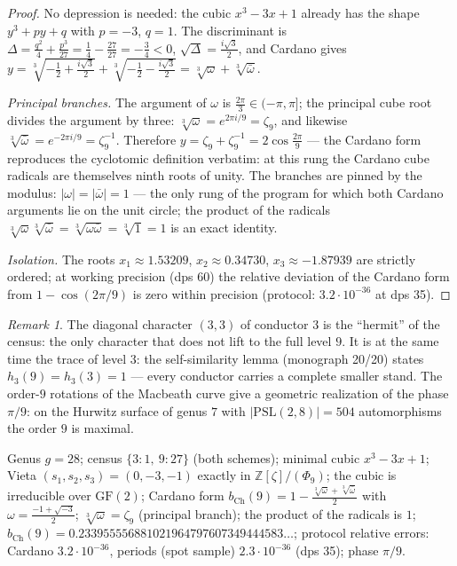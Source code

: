 \documentclass[11pt,a4paper]{article}
\theoremstyle{plain}
\theoremstyle{definition}
\theoremstyle{remark}
\newtheorem{remark}[theorem]{Remark}
\newcommand{\ZZ}{\mathbb{Z}}
\begin{document}
\begin{proof}
No depression is needed: the cubic $x^3-3x+1$ already has the
shape $y^3+py+q$ with $p=-3$, $q=1$. The discriminant is
$\Delta=\frac{q^2}{4}+\frac{p^3}{27}=\frac14-\frac{27}{27}
=-\frac34<0$, $\sqrt\Delta=\frac{i\sqrt3}{2}$, and Cardano gives
$y=\sqrt[3]{-\frac12+\frac{i\sqrt3}{2}}+\sqrt[3]{-\frac12-\frac{i\sqrt3}{2}}
=\sqrt[3]{\omega}+\sqrt[3]{\bar\omega}$.

\emph{Principal branches.} The argument of $\omega$ is
$\frac{2\pi}{3}\in(-\pi,\pi]$; the principal cube root divides
the argument by three: $\sqrt[3]{\omega}=e^{2\pi i/9}=\zeta_9$,
and likewise $\sqrt[3]{\bar\omega}=e^{-2\pi i/9}=\zeta_9^{-1}$.
Therefore $y=\zeta_9+\zeta_9^{-1}=2\cos\frac{2\pi}{9}$ --- the
Cardano form reproduces the cyclotomic definition verbatim: at
this rung the Cardano cube radicals are themselves ninth roots of
unity. The branches are pinned by the modulus:
$|\omega|=|\bar\omega|=1$ --- the only rung of the program for
which both Cardano arguments lie on the unit circle; the product
of the radicals
$\sqrt[3]{\omega}\sqrt[3]{\bar\omega}=\sqrt[3]{\omega\bar\omega}
=\sqrt[3]{1}=1$ is an exact identity.

\emph{Isolation.} The roots $x_1\approx1.53209$,
$x_2\approx0.34730$, $x_3\approx-1.87939$ are strictly ordered;
at working precision (dps 60) the relative deviation of the
Cardano form from $1-\cos(2\pi/9)$ is zero within precision
(protocol: $3.2\cdot10^{-36}$ at dps 35).
\end{proof}

\begin{remark}
The diagonal character $(3,3)$ of conductor $3$ is the
``hermit'' of the census: the only character that does not lift
to the full level $9$. It is at the same time the trace of level
$3$: the self-similarity lemma (monograph 20/20) states
$h_3(9)=h_3(3)=1$ --- every conductor carries a complete smaller
stand. The order-$9$ rotations of the Macbeath curve give a
geometric realization of the phase $\pi/9$: on the Hurwitz
surface of genus $7$ with $|\mathrm{PSL}(2,8)|=504$
automorphisms the order $9$ is maximal.
\end{remark}

\begin{databox}
Genus $g=28$; census $\{3\colon 1,\ 9\colon 27\}$ (both schemes);
minimal cubic $x^3-3x+1$; Vieta $(s_1,s_2,s_3)=(0,-3,-1)$ exactly
in $\ZZ[\zeta]/(\Phi_9)$; the cubic is irreducible over
$\mathrm{GF}(2)$; Cardano form
$b_{\mathrm{Ch}}(9)=1-\frac{\sqrt[3]{\omega}+\sqrt[3]{\bar\omega}}{2}$
with $\omega=\frac{-1+\sqrt{-3}}{2}$;
$\sqrt[3]{\omega}=\zeta_9$ (principal branch); the product of the
radicals is $1$;
$b_{\mathrm{Ch}}(9)=0.233955556881021964797607349444583\ldots$;
protocol relative errors: Cardano $3.2\cdot10^{-36}$, periods
(spot sample) $2.3\cdot10^{-36}$ (dps 35); phase $\pi/9$.
\end{databox}
\end{document}
